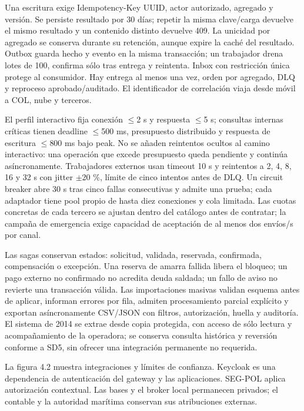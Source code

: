 \documentclass[11pt,letterpaper]{report}
\begin{document}
Una escritura exige Idempotency-Key UUID, actor autorizado, agregado y versión. Se persiste resultado por 30 días; repetir la misma clave/carga devuelve el mismo resultado y un contenido distinto devuelve 409. La unicidad por agregado se conserva durante su retención, aunque expire la caché del resultado. Outbox guarda hecho y evento en la misma transacción; un trabajador drena lotes de 100, confirma sólo tras entrega y reintenta. Inbox con restricción única protege al consumidor. Hay entrega al menos una vez, orden por agregado, DLQ y reproceso aprobado/auditado. El identificador de correlación viaja desde móvil a COL, nube y terceros.

El perfil interactivo fija conexión $\leq$2 s y respuesta $\leq$5 s; consultas internas críticas tienen deadline $\leq$500 ms, presupuesto distribuido y respuesta de escritura $\leq$800 ms bajo peak. No se añaden reintentos ocultos al camino interactivo: una operación que excede presupuesto queda pendiente y continúa asíncronamente. Trabajadores externos usan timeout 10 s y reintentos a 2, 4, 8, 16 y 32 s con jitter $\pm$20 \%, límite de cinco intentos antes de DLQ. Un circuit breaker abre 30 s tras cinco fallas consecutivas y admite una prueba; cada adaptador tiene pool propio de hasta diez conexiones y cola limitada. Las cuotas concretas de cada tercero se ajustan dentro del catálogo antes de contratar; la campaña de emergencia exige capacidad de aceptación de al menos dos envíos/s por canal.

Las sagas conservan estados: solicitud, validada, reservada, confirmada, compensación o excepción. Una reserva de amarra fallida libera el bloqueo; un pago externo no confirmado no acredita deuda saldada; un fallo de aviso no revierte una transacción válida. Las importaciones masivas validan esquema antes de aplicar, informan errores por fila, admiten procesamiento parcial explícito y exportan asíncronamente CSV/JSON con filtros, autorización, huella y auditoría. El sistema de 2014 se extrae desde copia protegida, con acceso de sólo lectura y acompañamiento de la operadora; se conserva consulta histórica y reversión conforme a SD5, sin ofrecer una integración permanente no requerida.

La figura 4.2 muestra integraciones y límites de confianza. Keycloak es una dependencia de autenticación del gateway y las aplicaciones. SEG-POL aplica autorización contextual. Las bases y el broker local permanecen privados; el contable y la autoridad marítima conservan sus atribuciones externas.
\end{document}
